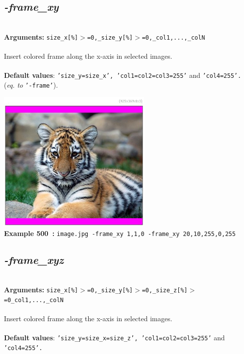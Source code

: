 \documentclass[a4paper,11pt,twoside]{book}
\begin{document}
\subsection{\emph{-frame\_xy} }\vspace*{-0.5em}
~\\\textbf{Arguments: } 
{\small \texttt{size\_x[\%]$>$=0,\_size\_y[\%]$>$=0,\_col1,...,\_colN}}\\~\\
Insert colored frame along the x-axis in selected images.
~\\~\\\textbf{Default values}: {\small \texttt{'size\_y=size\_x', 'col1=col2=col3=255'} and \texttt{'col4=255'.}}
~\\(\emph{eq. to} {\small \texttt{'-frame'}}).
\begin{center}\includegraphics[keepaspectratio=true,height=7cm,width=\textwidth]{img/gmic_def500.jpg}\\
{\footnotesize \textbf{Example 500~:} \texttt{image.jpg -frame\_xy 1,1,0 -frame\_xy 20,10,255,0,255}}
\end{center}

\subsection{\emph{-frame\_xyz} }\vspace*{-0.5em}
~\\\textbf{Arguments: } 
{\small \texttt{size\_x[\%]$>$=0,\_size\_y[\%]$>$=0,\_size\_z[\%]$>$=0\_col1,...,\_colN}}\\~\\
Insert colored frame along the x-axis in selected images.
~\\~\\\textbf{Default values}: {\small \texttt{'size\_y=size\_x=size\_z', 'col1=col2=col3=255'} and \texttt{'col4=255'.}}
\end{document}
